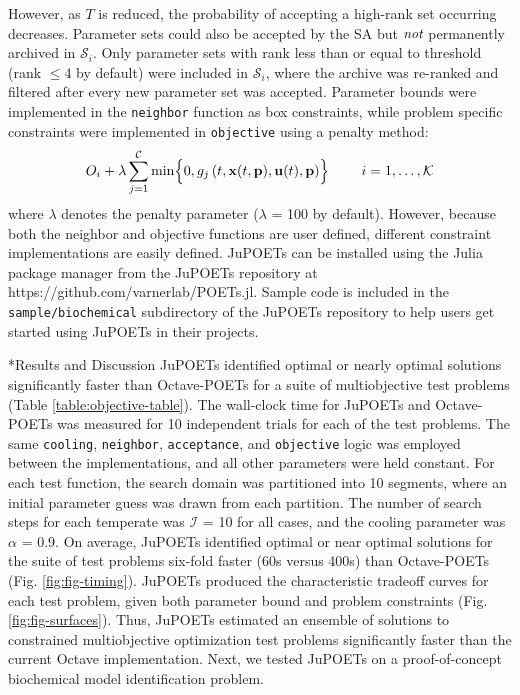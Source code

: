\documentclass[12pt]{article}
\makeatletter
\renewcommand\section{\@startsection
	{subsection}{2}{0mm}
	{-0.2in}
	{0.05\baselineskip}
	{\normalfont\large\bfseries}}
\makeatother
\begin{document}
However, as $T$ is reduced, the probability of accepting a high-rank set occurring decreases.
Parameter sets could also be accepted by the SA but $\emph{not}$ permanently archived in $\mathcal{S}_{i}$.
Only parameter sets with rank less than or equal to threshold (rank $\leq$4 by default) were included in $\mathcal{S}_{i}$, where the archive was re-ranked and filtered after
every new parameter set was accepted.
Parameter bounds were implemented in the \texttt{neighbor} function as box constraints, while problem specific constraints were implemented in \texttt{objective} using a penalty method:
\begin{equation}
  O_{i}+\lambda\sum_{j=1}^{\mathcal{C}}\min\Bigl\{0,g_j\left(t,\mathbf{x}(t,\mathbf{p}),\mathbf{u}(t),\mathbf{p}\right)\Bigr\}\qquad~i=1,\hdots,\mathcal{K}
\end{equation}where $\lambda$ denotes the penalty parameter ($\lambda$ = 100 by default).
However, because both the neighbor and objective functions are user defined, different constraint implementations are easily defined.
JuPOETs can be installed using the Julia package manager from the JuPOETs repository at https://github.com/varnerlab/POETs.jl.
Sample code is included in the \texttt{sample/biochemical} subdirectory of the JuPOETs repository to help users get started using JuPOETs in their projects.



\clearpage

\section*{Results and Discussion}
JuPOETs identified optimal or nearly optimal solutions significantly faster than Octave-POETs for a suite of multiobjective test problems (Table \ref{table:objective-table}).
The wall-clock time for JuPOETs and Octave-POETs was measured for 10 independent trials for each of the test problems.
The same \texttt{cooling}, \texttt{neighbor}, \texttt{acceptance}, and \texttt{objective} logic was employed between the implementations, and all other parameters were held constant.
For each test function, the search domain was partitioned into 10 segments, where an initial parameter guess was drawn from each partition.
The number of search steps for each temperate was $\mathcal{I}$ = 10 for all cases, and the cooling parameter was $\alpha$ = 0.9.
On average, JuPOETs identified optimal or near optimal solutions for the suite of test problems six-fold faster (60s versus 400s)
than Octave-POETs (Fig. \ref{fig:fig-timing}). JuPOETs produced the characteristic tradeoff curves for each test problem, given both parameter bound and
problem constraints (Fig. \ref{fig:fig-surfaces}).
Thus, JuPOETs estimated an ensemble of solutions to constrained multiobjective optimization test problems significantly faster than the current Octave implementation.
Next, we tested JuPOETs on a proof-of-concept biochemical model identification problem.
\end{document}
